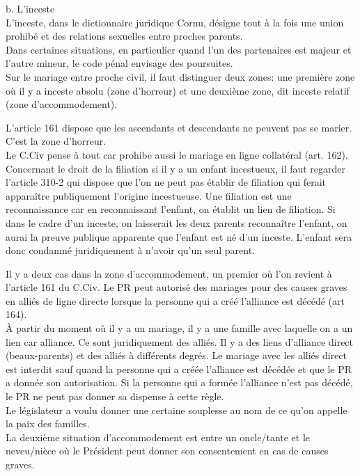 \documentclass[12pt, a4paper, openany]{book}
\begin{document}
b. L'inceste \\
L'inceste, dans le dictionnaire juridique Cornu, désigne tout à la fois une union prohibé et des relations sexuelles entre proches parents. \\
Dans certaines situations, en particulier quand l'un des partenaires est majeur et l'autre mineur, le code pénal envisage des poursuites. \\
Sur le mariage entre proche civil, il faut distinguer deux zones: une première zone où il y a inceste absolu (zone d'horreur) et une deuxième zone, dit inceste relatif (zone d'accommodement). 


L'article 161 dispose que les ascendants et descendants ne peuvent pas se marier. C'est la zone d'horreur. \\
Le C.Civ pense à tout car prohibe aussi le mariage en ligne collatéral (art. 162). \\
Concernant le droit de la filiation si il y a un enfant incestueux, il faut regarder l'article 310-2 qui dispose que l'on ne peut pas établir de filiation qui ferait apparaître publiquement l'origine incestueuse. Une filiation est une reconnaissance car en reconnaissant l'enfant, on établit un lien de filiation. Si dans le cadre d'un inceste, on laisserait les deux parents reconnaître l'enfant, on aurai la preuve publique apparente que l'enfant est né d'un inceste. L'enfant sera donc condamné juridiquement à n'avoir qu'un seul parent. 


Il y a deux cas dans la zone d'accommodement, un premier où l'on revient à l'article 161 du C.Civ. Le PR peut autorisé des mariages pour des causes graves en alliés de ligne directe lorsque la personne qui a créé l'alliance est décédé (art 164). \\
À partir du moment où il y a un mariage, il y a une famille avec laquelle on a un lien car alliance. Ce sont juridiquement des alliés. Il y a des liens d'alliance direct (beaux-parents) et des alliés à différents degrés.  Le mariage avec les alliés direct est interdit sauf quand la personne qui a créée l'alliance est décédée et que le PR a donnée son autorisation. Si la personne qui a formée l'alliance n'est pas décédé, le PR ne peut pas donner sa dispense à cette règle. \\ 
Le législateur a voulu donner une certaine souplesse au nom de ce qu'on appelle la paix des familles. \\
La deuxième situation d'accommodement est entre un oncle/tante et le neveu/nièce où le Président peut donner son consentement en cas de causes graves. 
\end{document}
